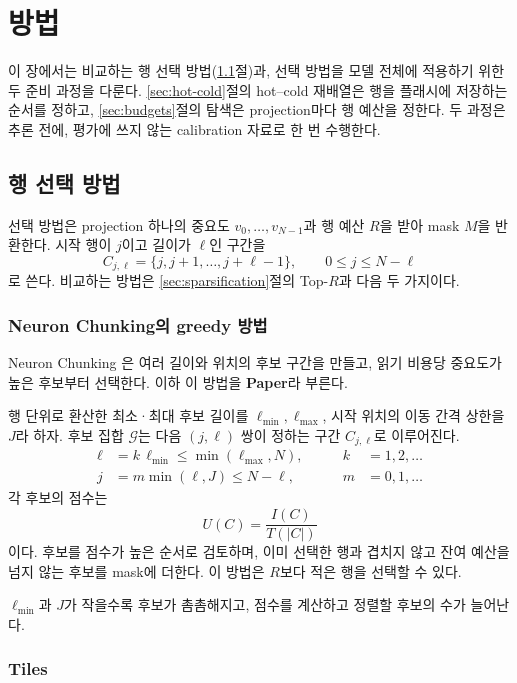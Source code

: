 \chapter{방법}\label{chap:method}

이 장에서는 비교하는 행 선택 방법(\ref{sec:selectors}절)과, 선택 방법을 모델 전체에 적용하기 위한 두 준비 과정을 다룬다. \ref{sec:hot-cold}절의 hot--cold 재배열은 행을 플래시에 저장하는 순서를 정하고, \ref{sec:budgets}절의 탐색은 projection마다 행 예산을 정한다. 두 과정은 추론 전에, 평가에 쓰지 않는 calibration 자료로 한 번 수행한다.

\section{행 선택 방법}\label{sec:selectors}

선택 방법은 projection 하나의 중요도 $v_0,\ldots,v_{N-1}$과 행 예산 $R$을 받아 mask $M$을 반환한다. 시작 행이 $j$이고 길이가 $\ell$인 구간을
\[
C_{j,\ell}=\{j,j+1,\ldots,j+\ell-1\},
\qquad 0\le j\le N-\ell
\]
로 쓴다. 비교하는 방법은 \ref{sec:sparsification}절의 Top-$R$과 다음 두 가지이다.

\subsection{Neuron Chunking의 greedy 방법}\label{sec:paper-greedy}

Neuron Chunking \cite{yang2025}은 여러 길이와 위치의 후보 구간을 만들고, 읽기 비용당 중요도가 높은 후보부터 선택한다. 이하 이 방법을 \textbf{Paper}라 부른다.

행 단위로 환산한 최소·최대 후보 길이를 $\ell_{\min},\ell_{\max}$, 시작 위치의 이동 간격 상한을 $J$라 하자. 후보 집합 $\mathcal G$는 다음 $(j,\ell)$ 쌍이 정하는 구간 $C_{j,\ell}$로 이루어진다.
\[
\begin{aligned}
\ell&=k\,\ell_{\min}\le\min(\ell_{\max},N),&\qquad k&=1,2,\ldots\\
j&=m\min(\ell,J)\le N-\ell,&\qquad m&=0,1,\ldots
\end{aligned}
\]
각 후보의 점수는
\[
U(C)=\frac{I(C)}{T(|C|)}
\]
이다. 후보를 점수가 높은 순서로 검토하며, 이미 선택한 행과 겹치지 않고 잔여 예산을 넘지 않는 후보를 mask에 더한다. 이 방법은 $R$보다 적은 행을 선택할 수 있다.

$\ell_{\min}$과 $J$가 작을수록 후보가 촘촘해지고, 점수를 계산하고 정렬할 후보의 수가 늘어난다.

\subsection{Tiles}\label{sec:tiles}

